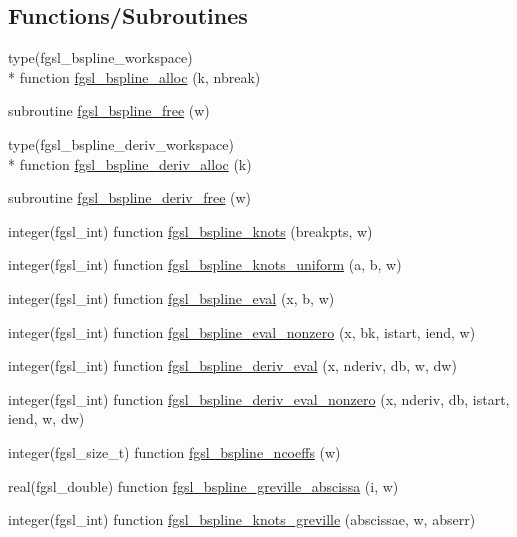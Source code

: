 \subsection*{Functions/\-Subroutines}
\begin{DoxyCompactItemize}
\item 
type(fgsl\-\_\-bspline\-\_\-workspace) \\*
function \hyperlink{bspline_8finc_a4e15c7b2231a5f1a625f5d182ca159ed}{fgsl\-\_\-bspline\-\_\-alloc} (k, nbreak)
\item 
subroutine \hyperlink{bspline_8finc_aa6355eaea88c1a3223784670cd61f944}{fgsl\-\_\-bspline\-\_\-free} (w)
\item 
type(fgsl\-\_\-bspline\-\_\-deriv\-\_\-workspace) \\*
function \hyperlink{bspline_8finc_afcbf1aea5432f70f6a80b96c503ce660}{fgsl\-\_\-bspline\-\_\-deriv\-\_\-alloc} (k)
\item 
subroutine \hyperlink{bspline_8finc_a8ccf44ef0167e5813a4671a5d5eaad8b}{fgsl\-\_\-bspline\-\_\-deriv\-\_\-free} (w)
\item 
integer(fgsl\-\_\-int) function \hyperlink{bspline_8finc_a0c926191aa070f99a3f01fd32fa1b95d}{fgsl\-\_\-bspline\-\_\-knots} (breakpts, w)
\item 
integer(fgsl\-\_\-int) function \hyperlink{bspline_8finc_ae8a83e75e87a6475b4ad8584c18c037d}{fgsl\-\_\-bspline\-\_\-knots\-\_\-uniform} (a, b, w)
\item 
integer(fgsl\-\_\-int) function \hyperlink{bspline_8finc_ad884eba33109f4963100c7a64601c9df}{fgsl\-\_\-bspline\-\_\-eval} (x, b, w)
\item 
integer(fgsl\-\_\-int) function \hyperlink{bspline_8finc_a2cf7b76c3b3eacc2458726ce7eec827a}{fgsl\-\_\-bspline\-\_\-eval\-\_\-nonzero} (x, bk, istart, iend, w)
\item 
integer(fgsl\-\_\-int) function \hyperlink{bspline_8finc_a1a0753fdf8d9e838bc1b1886b29e673c}{fgsl\-\_\-bspline\-\_\-deriv\-\_\-eval} (x, nderiv, db, w, dw)
\item 
integer(fgsl\-\_\-int) function \hyperlink{bspline_8finc_a42dce02a85085b1eddf167c995873e38}{fgsl\-\_\-bspline\-\_\-deriv\-\_\-eval\-\_\-nonzero} (x, nderiv, db, istart, iend, w, dw)
\item 
integer(fgsl\-\_\-size\-\_\-t) function \hyperlink{bspline_8finc_a88f74da4054f622ccec25854d7d82a26}{fgsl\-\_\-bspline\-\_\-ncoeffs} (w)
\item 
real(fgsl\-\_\-double) function \hyperlink{bspline_8finc_a3919f7952797fb2dd676ae3f910c6d9e}{fgsl\-\_\-bspline\-\_\-greville\-\_\-abscissa} (i, w)
\item 
integer(fgsl\-\_\-int) function \hyperlink{bspline_8finc_ae82914f8a3d09b557ceac031a59363a0}{fgsl\-\_\-bspline\-\_\-knots\-\_\-greville} (abscissae, w, abserr)
\end{DoxyCompactItemize}


